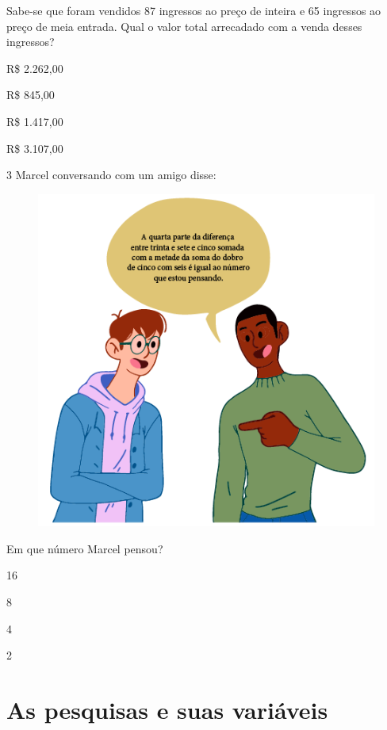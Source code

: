 Sabe-se que foram vendidos 87 ingressos ao preço de inteira e 65
ingressos ao preço de meia entrada. Qual o valor total arrecadado com a
venda desses ingressos?

\begin{minipage}{.5\textwidth}
\begin{escolha}
\item
  R\$ 2.262,00
\item
  R\$ 845,00
\item
  R\$ 1.417,00
\item
  R\$ 3.107,00
\end{escolha}
\end{minipage}


\pagebreak
\num{3} Marcel conversando com um amigo disse:

\begin{figure}[htpb!]
\centering
\includegraphics[width=.8\textwidth]{../ilustracoes/MAT5/SAEB_5ANO_MAT_figura94.png}
\end{figure}

Em que número Marcel pensou?

\begin{minipage}{.5\textwidth}
\begin{escolha}
\item
  16
\item
  8
\item
  4
\item
  2
\end{escolha}
\end{minipage}


\chapter{As pesquisas e suas variáveis}

